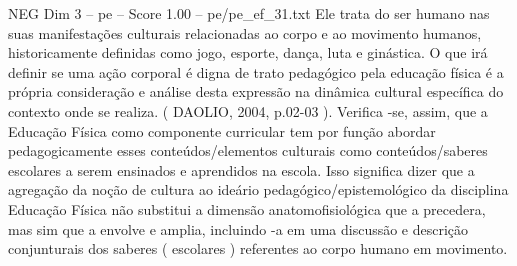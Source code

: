 \begin{textsample}{NEG Dim 3 – pe – Score 1.00 – pe/pe\_ef\_31.txt}
Ele trata do ser humano nas suas manifestações culturais relacionadas ao corpo e ao movimento humanos, historicamente definidas como jogo, esporte, dança, luta e ginástica.
O que irá definir se uma ação corporal é digna de trato pedagógico pela educação física é a própria consideração e análise desta expressão na dinâmica cultural específica do contexto onde se realiza. ( DAOLIO, 2004, p.02-03 ).
Verifica -se, assim, que a Educação Física como componente curricular tem por função abordar pedagogicamente esses conteúdos/elementos culturais como conteúdos/saberes escolares a serem ensinados e aprendidos na escola.
Isso significa dizer que a agregação da noção de cultura ao ideário pedagógico/epistemológico da disciplina Educação Física não substitui a dimensão anatomofisiológica que a precedera, mas sim que a envolve e amplia, incluindo -a em uma discussão e descrição conjunturais dos saberes ( escolares ) referentes ao corpo humano em movimento.

\end{textsample}
